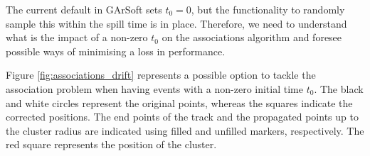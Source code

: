 The current default in GArSoft sets $t_{0} = 0$, but the functionality to randomly sample this within the spill time is in place. Therefore, we need to understand what is the impact of a non-zero $t_{0}$ on the associations algorithm and foresee possible ways of minimising a loss in performance.

Figure \ref{fig:associations_drift} represents a possible option to tackle the association problem when having events with a non-zero initial time $t_{0}$. The black and white circles represent the original points, whereas the squares indicate the corrected positions. The end points of the track and the propagated points up to the cluster radius are indicated using filled and unfilled markers, respectively. The red square represents the position of the cluster.

